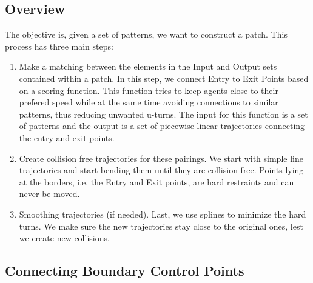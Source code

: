 \subsection{Overview}
\label{method:overview}

The objective is, given a set of patterns, we want to construct a patch.
This process has three main steps:
\begin{enumerate}
  \item Make a matching between the elements in the Input and Output sets contained within a patch. In this step, we connect Entry to Exit Points based on a scoring function. This function tries to keep agents close to their prefered speed while at the same time avoiding connections to similar patterns, thus reducing unwanted u-turns.  The input for this function is a set of patterns and the output is a set of piecewise linear trajectories connecting the entry and exit points.
  \item Create collision free trajectories for these pairings. We start with simple line trajectories and start bending them until they are collision free. Points lying at the borders, i.e. the Entry and Exit points, are hard restraints and can never be moved.
  \item Smoothing trajectories (if needed).  Last, we use splines to minimize the hard turns. We make sure the new trajectories stay close to the original ones, lest we create new collisions.
\end{enumerate}



\subsection{Connecting Boundary Control Points}

